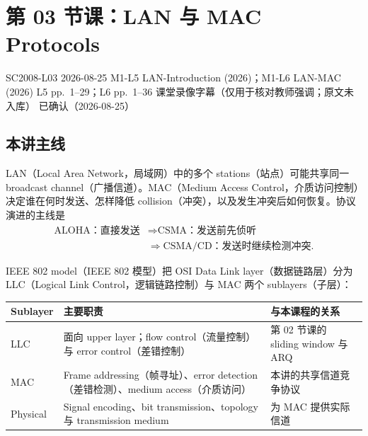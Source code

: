 
\section{第 03 节课：LAN 与 MAC Protocols}
\label{lecture:SC2008-L03}

\lecturemeta
  {SC2008-L03}
  {2026-08-25}
  {M1-L5 LAN-Introduction (2026)；M1-L6 LAN-MAC (2026)}
  {L5 pp.~1--29；L6 pp.~1--36}
  {课堂录像字幕（仅用于核对教师强调；原文未入库）}
  {已确认（2026-08-25）}

\subsection{本讲主线}

LAN（Local Area Network，局域网）中的多个 stations（站点）可能共享同一 broadcast channel（广播信道）。MAC（Medium Access Control，介质访问控制）决定谁在何时发送、怎样降低 collision（冲突），以及发生冲突后如何恢复。协议演进的主线是
\[
\begin{aligned}
  \text{ALOHA：直接发送}
  &\Longrightarrow \text{CSMA：发送前先侦听}\\
  &\Longrightarrow \text{CSMA/CD：发送时继续检测冲突}.
\end{aligned}
\]


IEEE 802 model（IEEE 802 模型）把 OSI Data Link layer（数据链路层）分为 LLC（Logical Link Control，逻辑链路控制）与 MAC 两个 sublayers（子层）：

\begin{center}
\small
\begin{tabularx}{\textwidth}{@{}>{\raggedright\arraybackslash}p{3.0cm}XX@{}}
  \toprule
  Sublayer & 主要职责 & 与本课程的关系 \\
  \midrule
  LLC & 面向 upper layer；flow control（流量控制）与 error control（差错控制） & 第 02 节课的 sliding window 与 ARQ \\
  MAC & Frame addressing（帧寻址）、error detection（差错检测）、medium access（介质访问） & 本讲的共享信道竞争协议 \\
  Physical & Signal encoding、bit transmission、topology 与 transmission medium & 为 MAC 提供实际信道 \\
  \bottomrule
\end{tabularx}
\end{center}

